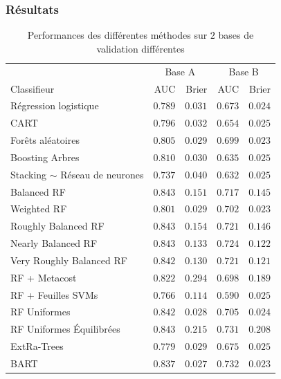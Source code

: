 \documentclass[dvipsnames,10pt]{beamer}
\theoremstyle{plain}
\theoremstyle{definition}
\begin{document}
\begin{frame}
\frametitle{Résultats}
\vspace{-1.1cm}
\small{
\begin{table}[H]
    \centering
    \begin{tabular}{lrrrr}
    \toprule
    & \multicolumn{2}{c}{Base A}  & \multicolumn{2}{c}{Base B} \\ 
    \cmidrule(lr){2-3} \cmidrule(lr){4-5}
    Classifieur & AUC & Brier & AUC & Brier \\
    \midrule
    Régression logistique & $0.789$ & $0.031$ & $0.673$ & $0.024$ \\
    CART & $0.796$ & $0.032$ & $0.654$ & $0.025$ \\
    Forêts aléatoires & $0.805$ & $0.029$ & $0.699$ & $0.023$ \\
    Boosting Arbres & $0.810$ & $0.030$ & $0.635$ & $0.025$ \\
    Stacking $\sim$ Réseau de neurones & $0.737$ & $0.040$ & $0.632$ & $0.025$ \\
    Balanced RF & $0.843$ & $0.151$ & $0.717$ & $0.145$ \\
    Weighted RF & $0.801$ & $0.029$ & $0.702$ & $0.023$ \\
    Roughly Balanced RF & $0.843$ & $0.154$ & $0.721$ & $0.146$ \\
    Nearly Balanced RF & $0.843$ & $0.133$ & $0.724$ & $0.122$ \\
    Very Roughly Balanced RF & $0.842$ & $0.130$ & $0.721$ & $0.121$ \\
    RF + Metacost & $0.822$ & $0.294$ & $0.698$ & $0.189$ \\
    RF + Feuilles SVMs & $0.766$ & $0.114$ & $0.590$ & $0.025$ \\
    RF Uniformes & $0.842$ & $0.028$ & $0.705$ & $0.024$ \\
    RF Uniformes Équilibrées & $0.843$ & $0.215$ & $0.731$ & $0.208$ \\
    ExtRa-Trees & $0.779$ & $0.029$ & $0.675$ & $0.025$ \\
    BART & $0.837$ & $0.027$ & $0.732$ & $0.023$ \\
    \bottomrule
    \end{tabular}
    \caption{Performances des différentes méthodes sur $2$ bases de validation différentes}\label{table:resultats}
\end{table}
}
\end{frame}
\end{document}
